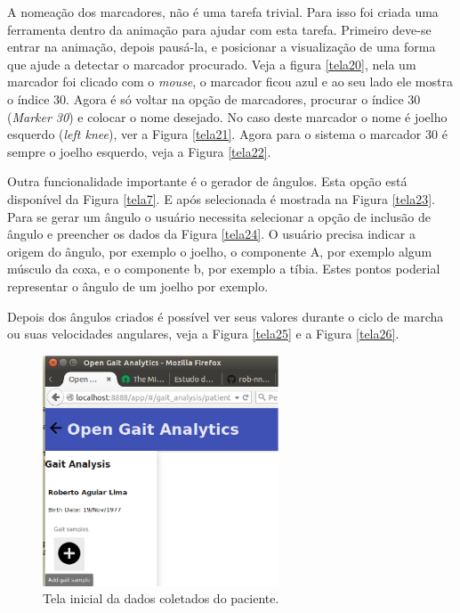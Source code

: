 A nomeação dos marcadores, não é uma tarefa trivial. Para isso foi criada uma ferramenta dentro da animação para ajudar com esta tarefa. Primeiro deve-se entrar na animação, depois pausá-la, e posicionar a visualização de uma forma que ajude a detectar o marcador procurado. Veja a figura \ref{tela20}, nela um marcador foi clicado com o \emph{mouse}, o marcador ficou azul e ao seu lado ele mostra o índice 30. 
Agora é só voltar na opção de marcadores, procurar o índice 30 (\emph{Marker 30}) e colocar o nome desejado. No caso deste marcador o nome é joelho esquerdo (\emph{left knee}), ver a Figura \ref{tela21}.
Agora para o sistema o marcador 30 é sempre o joelho esquerdo, veja a Figura \ref{tela22}.

Outra funcionalidade importante é o gerador de ângulos. Esta opção está disponível da Figura \ref{tela7}. E após selecionada é mostrada na Figura \ref{tela23}. 
Para se gerar um ângulo o usuário necessita selecionar a opção de inclusão de ângulo e preencher os dados da Figura \ref{tela24}. O usuário precisa indicar a origem do ângulo, por exemplo o joelho, o componente A, por exemplo algum músculo da coxa, e o componente b, por exemplo a tíbia. Estes pontos poderial representar o ângulo de um joelho por exemplo.

Depois dos ângulos criados é possível ver seus valores durante o ciclo de marcha ou suas velocidades angulares, veja a Figura \ref{tela25} e a Figura \ref{tela26}.

\begin{figure}[ht]
	\centering
	\includegraphics[width=7cm]{figuras/tela4.eps}
	\caption{Tela inicial da dados coletados do paciente.}
	\label{tela4}
\end{figure}


